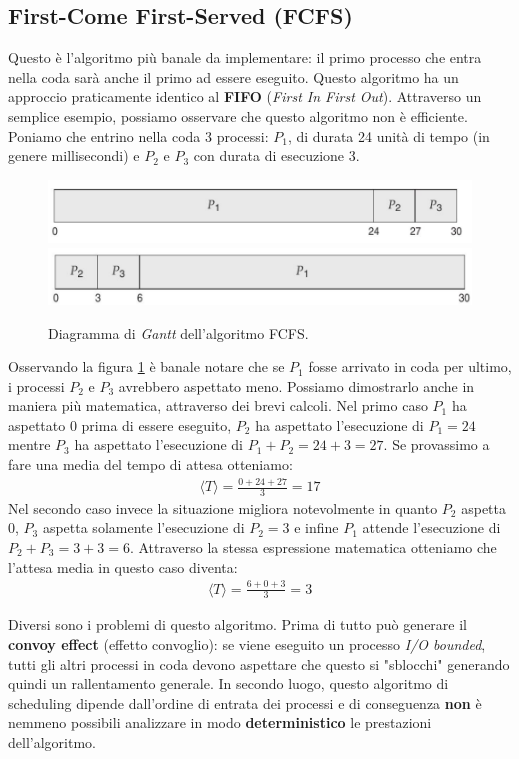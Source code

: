 \subsection{First-Come First-Served (FCFS)}
Questo è l'algoritmo più banale da implementare: il primo processo che entra nella coda sarà anche il primo ad essere eseguito. Questo algoritmo ha un approccio praticamente identico al \textbf{FIFO} (\textit{First In First Out}). Attraverso un semplice esempio, possiamo osservare che questo algoritmo non è efficiente. Poniamo che entrino nella coda 3 processi: $P_1$, di durata 24 unità di tempo (in genere millisecondi) e $P_2$ e $P_3$ con durata di esecuzione 3.  
\begin{figure}[h]
    \centering
    \includegraphics[width = .7\textwidth]{../res/imgs/CPU scheduling/FCFS.png}
    \includegraphics[width = .7\textwidth]{../res/imgs/CPU scheduling/FCFS2.png}
    \caption{Diagramma di \textit{Gantt} dell'algoritmo FCFS.}
    \label{fig:FCFS}
\end{figure}
Osservando la figura \ref{fig:FCFS} è banale notare che se $P_1$ fosse arrivato in coda per ultimo, i processi $P_2$ e $P_3$ avrebbero aspettato meno.
Possiamo dimostrarlo anche in maniera più matematica, attraverso dei brevi calcoli. Nel primo caso $P_1$ ha aspettato 0 prima di essere eseguito, $P_2$ ha aspettato l'esecuzione di $P_1 = 24$ mentre $P_3$ ha aspettato l'esecuzione di $P_1 + P_2 = 24 + 3 = 27$. Se provassimo a fare una media del tempo di attesa otteniamo:
\begin{gather*}
    \langle T\rangle = \frac{0 + 24 + 27}{3} = 17
\end{gather*}
Nel secondo caso invece la situazione migliora notevolmente in quanto $P_2$ aspetta 0, $P_3$ aspetta solamente l'esecuzione di $P_2 = 3$ e infine $P_1$ attende l'esecuzione di $P_2 + P_3 = 3 + 3 = 6$. Attraverso la stessa espressione matematica otteniamo che l'attesa media in questo caso diventa:
\begin{gather*}
    \langle T \rangle = \frac{6 + 0 + 3}{3} = 3
\end{gather*}

Diversi sono i problemi di questo algoritmo. Prima di tutto può generare il \textbf{convoy effect} (effetto convoglio): se viene eseguito un processo \textit{I/O bounded}, tutti gli altri processi in coda devono aspettare che questo si "sblocchi" generando quindi un rallentamento generale. In secondo luogo, questo algoritmo di scheduling dipende dall'ordine di entrata dei processi e di conseguenza \textbf{non} è nemmeno possibili analizzare in modo \textbf{deterministico} le prestazioni dell'algoritmo.
% 
